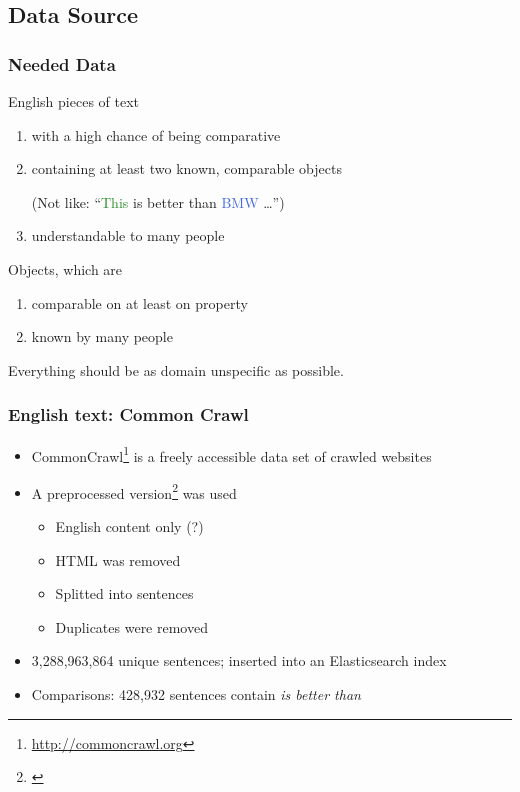 \documentclass[11pt,aspectratio=169,usenames,dvipsnames]{beamer}
\begin{document}
    \subsection{Data Source}
    \frame{\subsectionpage}

    \begin{frame}[t]
        \frametitle{Needed Data}
        English pieces of text
        \begin{enumerate}
            \item with a high chance of being comparative
            \item containing at least two known, comparable objects\\
            \begin{scriptsize}
                (Not like: \enquote{\textcolor{ForestGreen}{This} is better than \textcolor{RoyalBlue}{BMW} \ldots})
            \end{scriptsize}
            \item understandable to many people
        \end{enumerate}\pause

        Objects, which are
        \begin{enumerate}
            \item comparable on at least on property
            \item known by many people
        \end{enumerate}\pause
        Everything should be as domain unspecific as possible.
    \end{frame}

    \begin{frame}[t]
        \frametitle{English text: Common Crawl}
        \begin{itemize}
            \item CommonCrawl\footnote{\url{http://commoncrawl.org}} is a freely accessible data set of crawled websites
            \item A preprocessed version\footnote{\cite{Panchenko:2017aa}} was used
            \begin{itemize}
                \item English content only (?)
                \item HTML was removed
                \item Splitted into sentences
                \item Duplicates were removed
            \end{itemize}\pause
            \item 3,288,963,864 unique sentences; inserted into an Elasticsearch index
            \item Comparisons: 428,932 sentences contain \emph{is better than}
        \end{itemize}

    \end{frame}
\end{document}

